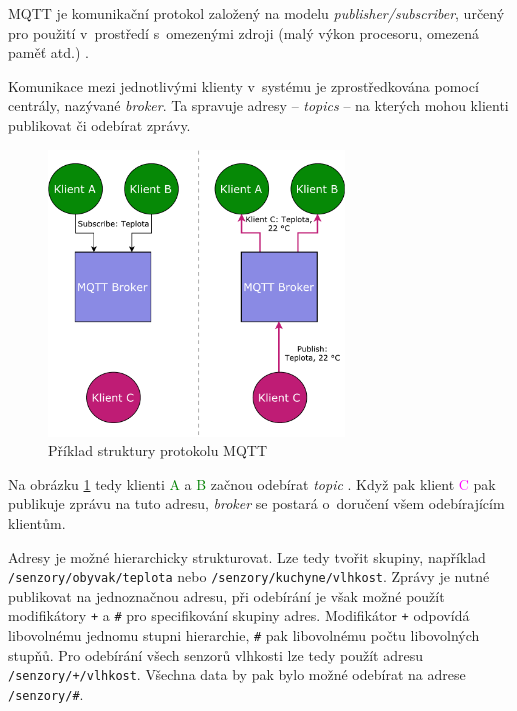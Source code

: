 MQTT je komunikační protokol založený na modelu \textit{publisher/subscriber}, určený pro použití v~prostředí s~omezenými zdroji (malý výkon procesoru, omezená paměť atd.) \cite{mqtt_valerie}.

Komunikace mezi jednotlivými klienty v~systému je zprostředkována pomocí centrály, nazývané \textit{broker}. Ta spravuje adresy -- \textit{topics} -- na kterých mohou klienti publikovat či odebírat zprávy.

\begin{figure}[h!]
    \centering
    \includegraphics[width=0.7\textwidth]{images/basic_mqtt.pdf}
    \caption[Příklad struktury protokolu MQTT]{Příklad struktury protokolu MQTT \cite{mqtt_eclipse}}
    \label{fig:basic_mqtt}
\end{figure}

Na obrázku \ref{fig:basic_mqtt} tedy klienti \textcolor{green}{A} a \textcolor{green}{B} začnou odebírat \textit{topic} . Když pak klient \textcolor{magenta}{C} pak publikuje zprávu na tuto adresu, \textcolor{blue2}{\textit{broker}} se postará o~doručení všem odebírajícím klientům.

Adresy je možné hierarchicky strukturovat. Lze tedy tvořit skupiny, například \verb|/senzory/obyvak/teplota| nebo \verb|/senzory/kuchyne/vlhkost|. Zprávy je nutné publikovat na jednoznačnou adresu, při odebírání je však možné použít modifikátory \verb|+| a \verb|#| pro specifikování skupiny adres. Modifikátor \verb|+| odpovídá libovolnému jednomu stupni hierarchie, \verb|#| pak libovolnému počtu libovolných stupňů. Pro odebírání všech senzorů vlhkosti lze tedy použít adresu \verb|/senzory/+/vlhkost|. Všechna data by pak bylo možné odebírat na adrese \verb|/senzory/#|. \cite{mqtt_eclipse}


